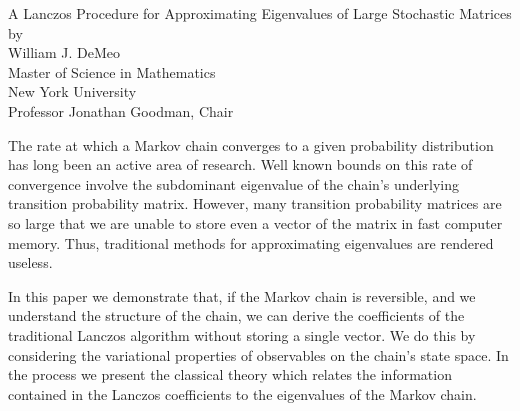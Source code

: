 \begin{center}
\newcommand\skipsize{6pt}
A Lanczos Procedure for Approximating Eigenvalues of Large Stochastic Matrices\\[\skipsize]
by\\[\skipsize]
William J. DeMeo\\[\skipsize]
Master of Science in Mathematics\\[\skipsize]
New York University\\[\skipsize]
Professor Jonathan Goodman, Chair
\end{center}

The rate at which a Markov chain converges to a given probability distribution
has long been an active area of research. Well known bounds on this rate of
convergence involve the subdominant eigenvalue of the chain's underlying
transition probability matrix. However, many transition probability matrices are
so large that we are unable to store even a vector of the matrix in fast
computer memory. Thus, traditional methods for approximating eigenvalues are
rendered useless. 

In this paper we demonstrate that, if the Markov chain is reversible, and we
understand the structure of the chain, we can derive the coefficients of the
traditional Lanczos algorithm without storing a single vector. We do this by
considering the variational properties of observables on the chain's state
space. In the process we present the classical theory which relates the
information contained in the Lanczos coefficients to the eigenvalues of the
Markov chain. 
